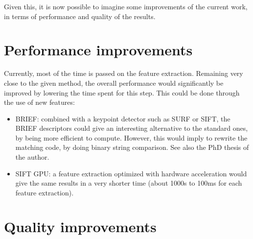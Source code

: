Given this, it is now possible to imagine some improvements of the current work, in terms of performance and quality of the results.

\section{Performance improvements}

Currently, most of the time is passed on the feature extraction. Remaining very close to the given method, the overall performance would significantly be improved by lowering the time spent for this step. This could be done through the use of new features:
\begin{itemize}
\item BRIEF: combined with a keypoint detector such as \gls{SURF} or \gls{SIFT}, the \gls{BRIEF} descriptors\cite{Calonder10-brief} could give an interesting alternative to the standard ones, by being more efficient to compute. However, this would imply to rewrite the matching code, by doing binary string comparison. See also the PhD thesis of the author\cite{Calonder10_PhD}.
\item SIFT GPU: a feature extraction optimized with hardware acceleration would give the same results in a very shorter time (about 1000s to 100ms for each feature extraction).
\end{itemize}

\section{Quality improvements}


